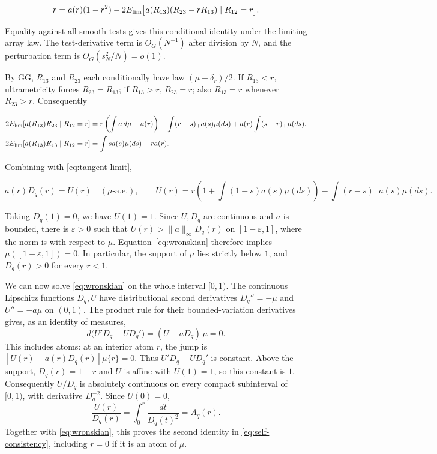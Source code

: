 \documentclass[11pt]{article}
\begin{document}
\begin{equation}\label{eq:tangent-limit}
r=a(r)(1-r^2)-2E_{\rm lim}\big[a(R_{13})(R_{23}-r R_{13})\mid R_{12}=r\big].
\end{equation}

Equality against all smooth tests gives this conditional identity under the limiting array law. The test-derivative term is $O_G(N^{-1})$ after division by $N$, and the perturbation term is $O_G(s_N^2/N)=o(1)$.

By GG, $R_{13}$ and $R_{23}$ each conditionally have law $(\mu+\delta_r)/2$. If $R_{13}<r$, ultrametricity forces $R_{23}=R_{13}$; if $R_{13}>r$, $R_{23}=r$; also $R_{13}=r$ whenever $R_{23}>r$. Consequently

\begin{equation*}
\begin{aligned}
 2E_{\rm lim}[a(R_{13})R_{23}\mid R_{12}=r]
   &= r\left(\int a\,d\mu+a(r)\right)-\int(r-s)_+a(s)\mu(ds)
                         +a(r)\int (s-r)_+\mu(ds),\\
 2E_{\rm lim}[a(R_{13})R_{13}\mid R_{12}=r]
   &= \int s a(s)\mu(ds)+r a(r).
 \end{aligned}
\end{equation*}

Combining with \eqref{eq:tangent-limit},

\begin{equation}\label{eq:wronskian}
a(r)D_q(r)=U(r)\quad(\mu\text{-a.e.}),\qquad
 U(r)=r\left(1+\int (1-s)a(s)\mu(ds)\right)-\int (r-s)_+a(s)\mu(ds).
\end{equation}

Taking $D_q(1)=0$, we have $U(1)=1$. Since $U,D_q$ are
continuous and $a$ is bounded, there is $\varepsilon>0$ such that
$U(r)>\|a\|_\infty D_q(r)$ on $[1-\varepsilon,1]$, where the norm
is with respect to $\mu$. Equation~\eqref{eq:wronskian} therefore implies
$\mu([1-\varepsilon,1])=0$. In particular, the support of $\mu$ lies
strictly below $1$, and $D_q(r)>0$ for every $r<1$.

We can now solve \eqref{eq:wronskian} on the whole interval $[0,1)$.
The continuous Lipschitz functions $D_q,U$ have distributional second
derivatives $D_q''=-\mu$ and $U''=-a\mu$ on $(0,1)$. The product rule
for their bounded-variation derivatives gives, as an identity of measures,
\[
 d\big(U'D_q-U D_q'\big)=(U-aD_q)\,\mu=0.
\]
This includes atoms: at an interior atom $r$, the jump is
$[U(r)-a(r)D_q(r)]\mu\{r\}=0$.
Thus $U'D_q-U D_q'$ is constant. Above the support, $D_q(r)=1-r$
and $U$ is affine with $U(1)=1$, so this constant is $1$.
Consequently $U/D_q$ is absolutely continuous on every compact
subinterval of $[0,1)$, with derivative $D_q^{-2}$. Since $U(0)=0$,
\[
 \frac{U(r)}{D_q(r)}=\int_0^r\frac{dt}{D_q(t)^2}=A_q(r).
\]
Together with \eqref{eq:wronskian}, this proves the second identity in
\eqref{eq:self-consistency}, including $r=0$ if it is an atom of $\mu$.
\end{document}
